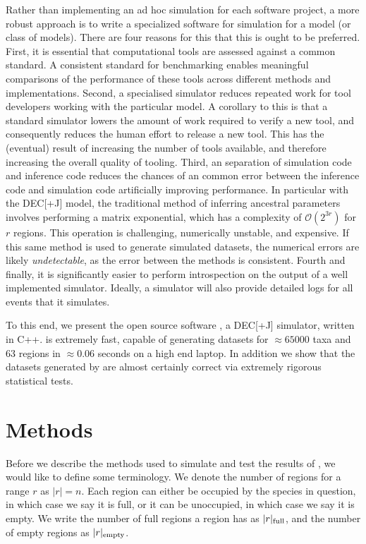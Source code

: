 \documentclass{article}
\begin{document}
Rather than implementing an ad hoc simulation for each software project, a more
robust approach is to write a specialized software for simulation for a model
(or class of models).
There are four reasons for this that this is ought to be preferred.
First, it is essential that computational tools are assessed against a common
standard.
A consistent standard for benchmarking enables meaningful comparisons of the
performance of these tools across different methods and implementations.
Second, a specialised simulator reduces repeated work for tool developers
working with the particular model.
A corollary to this is that a standard simulator lowers the amount of work
required to verify a new tool, and consequently reduces the human effort to
release a new tool.
This has the (eventual) result of increasing the number of tools available, and
therefore increasing the overall quality of tooling.
Third, an separation of simulation code and inference code reduces the chances
of an common error between the inference code and simulation code artificially
improving performance.
In particular with the DEC[+J] model, the traditional method of inferring
ancestral parameters involves performing a matrix exponential, which has a
complexity of $\mathcal{O}(2^{3r})$ for $r$ regions\cite{bettisworth_lagrange-ng_2023}.
This operation is challenging, numerically unstable, and expensive.
If this same method is used to generate simulated datasets, the numerical errors
are likely \textit{undetectable}, as the error between the methods is
consistent.
Fourth and finally, it is significantly easier to perform introspection on the
output of a well implemented simulator.
Ideally, a simulator will also provide detailed logs for all events that it
simulates.

To this end, we present the open source software \bigrig{}, a DEC[+J] simulator,
written in C++.
\bigrig{} is extremely fast, capable of generating datasets for $\approx65000$
taxa and 63 regions in $\approx0.06$ seconds on a high end laptop.
In addition we show that the datasets generated by \bigrig{} are almost
certainly correct via extremely rigorous statistical tests.

\section{Methods}

Before we describe the methods used to simulate and test the results of
\bigrig{}, we would like to define some terminology. We denote the number of
regions for a range \( r \) as \( |r| = n\).
Each region can either be occupied by the species in question, in which case we
say it is full, or it can be unoccupied, in which case we say it is empty.
We write the number of full regions a region has as \( |r|_\text{full} \), and the
number of empty regions as \( |r|_\text{empty} \).
\end{document}
